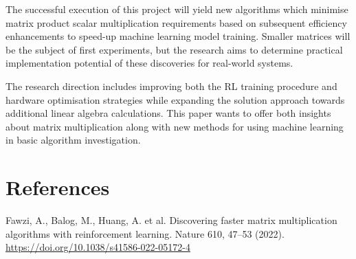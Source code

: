 \documentclass{article}
\begin{document}
The successful execution of this project will yield new algorithms which minimise matrix product scalar multiplication requirements based on subsequent efficiency enhancements to speed-up machine learning model training. Smaller matrices will be the subject of first experiments, but the research aims to determine practical implementation potential of these discoveries for real-world systems.

The research direction includes improving both the RL training procedure and hardware optimisation strategies while expanding the solution approach towards additional linear algebra calculations. This paper wants to offer both insights about matrix multiplication along with new methods for using machine learning in basic algorithm investigation.

\section{References}
\begin{thebibliography}{9}
     Fawzi, A., Balog, M., Huang, A. et al. Discovering faster matrix multiplication algorithms with reinforcement learning. Nature 610, 47–53 (2022). \url{https://doi.org/10.1038/s41586-022-05172-4}
\end{thebibliography}
\end{document}
